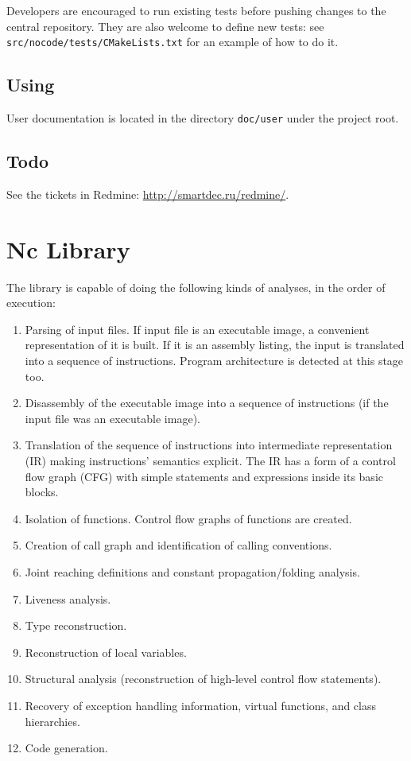 \documentclass[a4paper,12pt]{article}
\begin{document}
Developers are encouraged to run existing tests before pushing changes to the central repository.
They are also welcome to define new tests: see \verb|src/nocode/tests/CMakeLists.txt| for an example of how to do it.

\subsection{Using}

User documentation is located in the directory \verb|doc/user| under the project root.

\subsection{Todo}

See the tickets in Redmine: \url{http://smartdec.ru/redmine/}.

\clearpage
\section{Nc Library}

The library is capable of doing the following kinds of analyses, in the order of execution:
\begin{enumerate}
\item Parsing of input files.
If input file is an executable image, a convenient representation of it is built.
If it is an assembly listing, the input is translated into a sequence of instructions.
Program architecture is detected at this stage too.
\item Disassembly of the executable image into a sequence of instructions (if the input file was an executable image).
\item Translation of the sequence of instructions into intermediate representation (IR) making instructions' semantics explicit.
The IR has a form of a control flow graph (CFG) with simple statements and expressions inside its basic blocks.
\item Isolation of functions. Control flow graphs of functions are created.
\item Creation of call graph and identification of calling conventions.
\item Joint reaching definitions and constant propagation/folding analysis.
\item Liveness analysis.
\item Type reconstruction.
\item Reconstruction of local variables.
\item Structural analysis (reconstruction of high-level control flow statements).
\item Recovery of exception handling information, virtual functions, and class hierarchies.
\item Code generation.
\end{enumerate}
\end{document}

